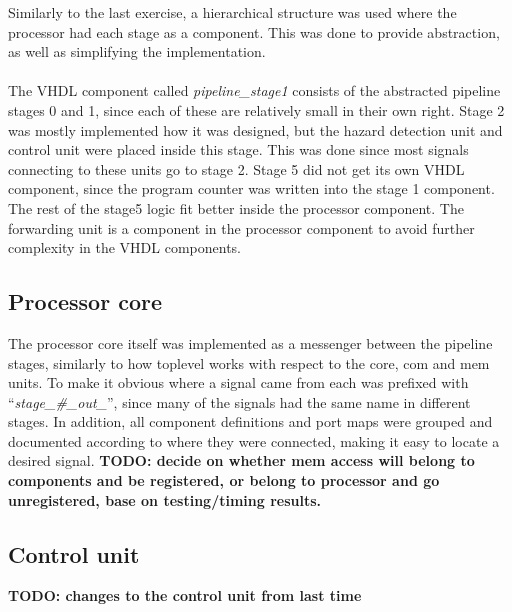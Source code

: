 Similarly to the last exercise, a hierarchical structure was used where the
processor had each stage as a component. This was done to provide abstraction,
as well as simplifying the implementation.
\paragraph*{}
The VHDL component called \emph{pipeline\_stage1} consists of the abstracted
pipeline stages 0 and 1, since each of these are relatively small in their own
right. Stage 2 was mostly implemented how it was designed, but the hazard
detection unit and control unit were placed inside this stage. This was done
since most signals connecting to these units go to stage 2. Stage 5 did not get
its own VHDL component, since the program counter was written into the stage 1
component. The rest of the stage5 logic fit better inside the processor
component. The forwarding unit is a component in the processor component to
avoid further complexity in the VHDL components.

\subsection{Processor core}
The processor core itself was implemented as a messenger between the pipeline
stages, similarly to how toplevel works with respect to the core, com and mem
units. To make it obvious where a signal came from each was prefixed with
``\emph{stage\_\#\_out\_}'', since many of the signals had the same name in different
stages. In addition, all component definitions and port maps were grouped and
documented according to where they were connected, making it easy to locate a
desired signal.\newline
\textbf{TODO: decide on whether mem access will belong to components and be registered, or belong to processor and go unregistered, base on testing/timing results.}

\subsection{Control unit}
\textbf{TODO: changes to the control unit from last time}
